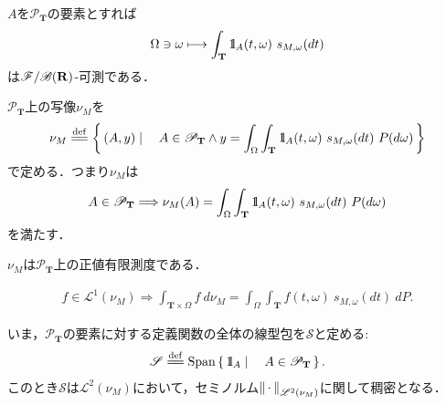 	\begin{screen}
		\begin{thm}
			$A$を$\mathscr{P}_{\mathbf{T}}$の要素とすれば
			\begin{align}
				\Omega \ni \omega \longmapsto \int_{\mathbf{T}} \mbox{1}\hspace{-0.25em}\mbox{l}_A(t,\omega)\ s_{M,\omega}(dt)
			\end{align}
			は$\mathscr{F}/\mathscr{B}(\mathbf{R})$-可測である．
		\end{thm}
	\end{screen}
	
	\begin{prf}
	\end{prf}
	
	$\mathscr{P}_{\mathbf{T}}$上の写像$\nu_M$を
	\begin{align}
		\nu_M \defeq \Set{(A,y)}{A \in \mathscr{P}_{\mathbf{T}} \wedge y = 
		\int_\Omega \int_{\mathbf{T}} \defunc_A(t,\omega)\ s_{M,\omega}(dt)\ P(d\omega)}
	\end{align}
	で定める．つまり$\nu_M$は
	\begin{align}
		A \in \mathscr{P}_{\mathbf{T}} \Longrightarrow
		\nu_M(A) = \int_\Omega \int_{\mathbf{T}} \defunc_A(t,\omega)\ s_{M,\omega}(dt)\ P(d\omega)
	\end{align}
	を満たす．
	
	\begin{screen}
		\begin{thm}[二乗可積分マルチンゲールで構成する測度]
			$\nu_M$は$\mathscr{P}_{\mathbf{T}}$上の正値有限測度である．
		\end{thm}
	\end{screen}
	
	\begin{screen}
		\begin{thm}[可積分可予測過程の積分表現]
			\begin{align}
				f \in \mathscr{L}^1(\nu_M) \Longrightarrow 
				\int_{\mathbf{T} \times \Omega} f\ d\nu_M = \int_\Omega \int_{\mathbf{T}} f(t,\omega)\ s_{M,\omega}(dt)\ dP.
			\end{align}
		\end{thm}
	\end{screen}
	
	いま，$\mathscr{P}_{\mathbf{T}}$の要素に対する定義関数の全体の線型包を$\mathscr{S}$と定める:
	\begin{align}
		\mathscr{S} \defeq \operatorname{Span}\Set{\defunc_A}{A \in \mathscr{P}_{\mathbf{T}}}.
	\end{align}
	このとき$\mathscr{S}$は$\mathscr{L}^2(\nu_M)$において，セミノルム$\left\|\, \cdot\, \right\|_{\mathscr{L}^2(\nu_M)}$に関して稠密となる．
	
	\begin{screen}
		\begin{thm}
			
		\end{thm}
	\end{screen}